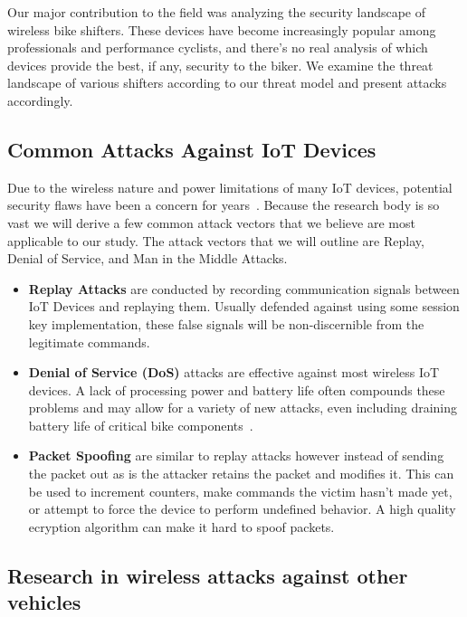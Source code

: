 \documentclass[letterpaper,twocolumn,10pt]{article}
\begin{document}
Our major contribution to the field was analyzing the security landscape of wireless bike shifters. These devices have become increasingly popular among professionals and performance cyclists, and there's no real analysis of which devices provide the best, if any, security to the biker. We examine the threat landscape of various shifters according to our threat model and present attacks accordingly.


\subsection{Common Attacks Against IoT Devices}

Due to the wireless nature and power limitations of many IoT devices, potential security flaws have been a concern for years~\cite{HeXu}. Because the research body is so vast we will derive a few common attack vectors that we believe are most applicable to our study. The attack vectors that we will outline are Replay, Denial of Service, and Man in the Middle Attacks.

\begin{itemize}
  \item \textbf{Replay Attacks} are conducted by recording communication signals between IoT Devices and replaying them. Usually defended against using some session key implementation, these false signals will be non-discernible from the legitimate commands.
  \item \textbf{Denial of Service (DoS)} attacks are effective against most wireless IoT devices. A lack of processing power and battery life often compounds these problems and may allow for a variety of new attacks, even including draining battery life of critical bike components~\cite{Moyers}.
  \item \textbf{Packet Spoofing} are similar to replay attacks however instead of sending the packet out as is the attacker retains the packet and modifies it. This can be used to increment counters, make commands the victim hasn't made yet, or attempt to force the device to perform undefined behavior. A high quality ecryption algorithm can make it hard to spoof packets.
\end{itemize}

\subsection{Research in wireless attacks against other vehicles}
\end{document}
